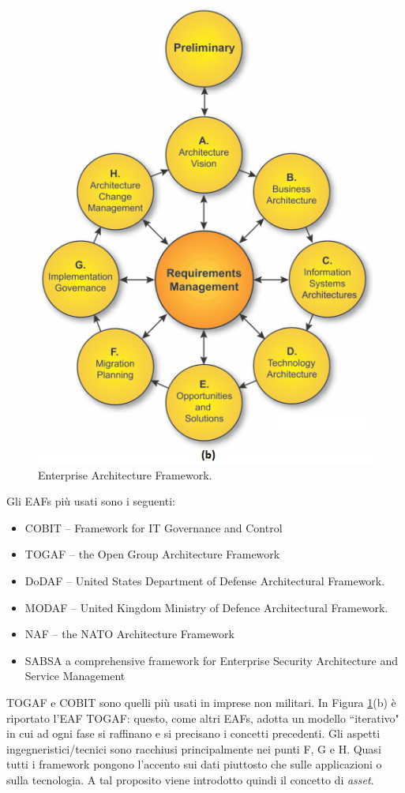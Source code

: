 \begin{figure}[htbp]
	\includegraphics[scale = 0.5]{images/EAF_iterative_model}
	\caption{Enterprise Architecture Framework.}
	\label{img:EAF}
\end{figure}
Gli EAFs più usati sono i seguenti:
\begin{itemize}
	\item COBIT -- Framework for IT Governance and Control
	\item TOGAF -- the Open Group Architecture Framework
	\item DoDAF -- United States Department of Defense Architectural Framework.
	\item MODAF -- United Kingdom Ministry of Defence Architectural Framework.
	\item NAF -- the NATO Architecture Framework
	\item SABSA a comprehensive framework for Enterprise Security Architecture and Service Management
\end{itemize}
TOGAF e COBIT sono quelli più usati in imprese non militari. In Figura \ref{img:EAF}(b) è riportato l'EAF TOGAF: questo, come altri EAFs, adotta un modello \textquotedblleft iterativo" in cui ad ogni fase si raffinano e si precisano i concetti precedenti. Gli aspetti ingegneristici/tecnici sono racchiusi principalmente nei punti F, G e H. Quasi tutti i framework pongono l'accento sui dati piuttosto che sulle applicazioni o sulla tecnologia. A tal proposito viene introdotto quindi il concetto di \textit{asset}.

